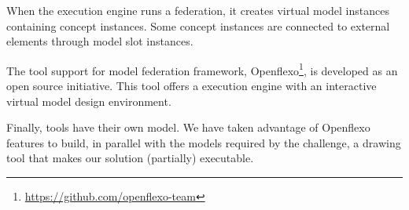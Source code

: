 When the \FML execution engine runs a federation, it creates virtual
model instances containing concept instances. Some concept instances
are connected to external elements through model slot instances.


The tool support for model federation framework,
Openflexo\footnote{\url{https://github.com/openflexo-team}}, is
developed as an open source initiative. This tool offers a \FML
execution engine with an interactive virtual model design environment.

Finally, tools have their own model. We have taken advantage of
Openflexo features to build, in parallel with the models  required by the challenge, a drawing tool that makes our
solution (partially) executable.
